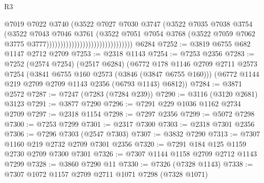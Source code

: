 \begin{lexlean}{R3}
\begin{coremodule}
                                                        @7019
                                                        @7022
                                                        @3740
                                                        (@3522
                                                          @7027
                                                          @7030
                                                          @3747
                                                          (@3522
                                                            @7035
                                                            @7038
                                                            @3754
                                                            (@3522
                                                              @7043
                                                              @7046
                                                              @3761
                                                              (@3522
                                                                @7051
                                                                @7054
                                                                @3768
                                                                (@3522
                                                                  @7059
                                                                  @7062
                                                                  @3775
                                                                  @3777)))))))))))))))))))))))))))))))
    @6284
@7252 := @3819 @6755 @682 @1147 @2712 @2709
@7253 := @2318 @1143
@7254 := @7253 @2356
@7283 := @7252
    (@2574 @7254)
    (@2517 @6284)
    (@6772
      @178
      @1146
      @2709
      @2711
      @2573
      @7254
      (@3841 @6755 @160 @2573 (@3846 (@3847 @6755 @160)))
      (@6772 @1144 @219 @2709 @2709 @1143 @2356 (@6793 @1143) @6812))
@7284 := @3871 @2572
@7287 := @7247 (@7283 (@7284 @239))
@7290 := @3116 (@3120 @2681) @3123
@7291 := @3877 @7290
@7296 := @7291 @229 @1036 @1162 @2734 @2709
@7297 := @2318 @1154
@7298 := @7297 @2356
@7299 := @5072 @7298
@7300 := @7253 @7299
@7301 := @2317 @7300
@7303 := @2318 @7301 @2356
@7306 := @7296 @7303 (@2547 @7303)
@7307 := @3832 @7290
@7313 := @7307 @1160 @219 @2732 @2709 @7301 @2356
@7320 := @7291 @184 @125 @1159 @2730 @2709 @7300 @7301
@7326 := @7307 @1144 @1158 @2709 @2712 @1143 @7299
@7328 := @3860 @7290 @11
@7330 := @7326 (@7328 @1143)
@7338 := @7307 @1072 @1157 @2709 @2711 @1071 @7298 (@7328 @1071)

\end{coremodule}
\end{lexlean}
